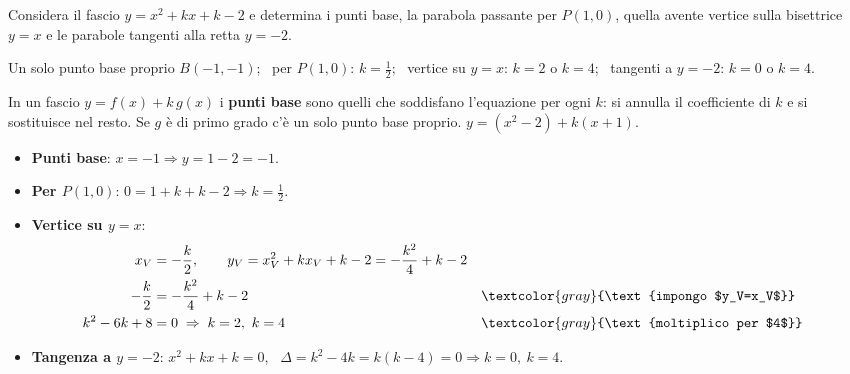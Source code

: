 \begin{question}[ID=5.5, subtitle={Fascio $y=x^2+kx+k-2$: punti base e tangenza}, difficulty=difficile, tags={parabola, fasci, parametrico}]
Considera il fascio $y=x^2+kx+k-2$ e determina i punti base, la parabola passante per $P(1,0)$, quella avente vertice sulla bisettrice $y=x$ e le parabole tangenti alla retta $y=-2$.
\begin{solution}
Un solo punto base proprio $B(-1,-1)$; \ per $P(1,0)$: $k=\tfrac12$; \ vertice su $y=x$: $k=2$ o $k=4$; \ tangenti a $y=-2$: $k=0$ o $k=4$.
\end{solution}
\begin{explanation}
In un fascio $y=f(x)+k\,g(x)$ i \textbf{punti base} sono quelli che soddisfano l'equazione per ogni $k$: si annulla il coefficiente di $k$ e si sostituisce nel resto. Se $g$ è di primo grado c'è un solo punto base proprio.
$y=(x^2-2)+k(x+1)$.
\begin{itemize}
    \item \textbf{Punti base}: $x=-1 \Rightarrow y=1-2=-1$.
    \item \textbf{Per $P(1,0)$}: $0=1+k+k-2 \Rightarrow k=\tfrac12$.
    \item \textbf{Vertice su $y=x$}:
    \[\begin{aligned}
    x_V &= -\dfrac k2, \qquad y_V=x_V^2+kx_V+k-2=-\dfrac{k^2}{4}+k-2\\
    -\dfrac k2 &= -\dfrac{k^2}{4}+k-2 && \textcolor{gray}{\text{impongo $y_V=x_V$}}\\
    k^2-6k+8 &= 0 \;\Rightarrow\; k=2,\ k=4 && \textcolor{gray}{\text{moltiplico per $4$}}
    \end{aligned}\]
    \item \textbf{Tangenza a $y=-2$}: $x^2+kx+k=0$, \ $\Delta=k^2-4k=k(k-4)=0 \Rightarrow k=0,\ k=4$.
\end{itemize}
\end{explanation}
\end{question}
